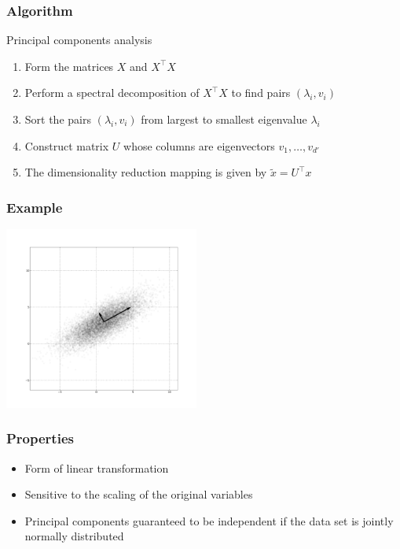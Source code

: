 \documentclass[10pt]{beamer}
\begin{document}
\begin{frame}
  \frametitle{Algorithm}
  \begin{block}{Principal components analysis}
  \begin{enumerate}
	\item Form the matrices $X$ and $X^\top X$
	\item Perform a spectral decomposition of $X^\top X$ to find pairs $(\lambda_i,v_i)$
	\item Sort the pairs $(\lambda_i,v_i)$ from largest to smallest eigenvalue $\lambda_i$
	\item Construct matrix $U$ whose columns are eigenvectors $v_1,\ldots,v_{d'}$
	\item The dimensionality reduction mapping is given by $\tilde{x} = U^\top x$
  \end{enumerate}
  \end{block}
\end{frame}

\begin{frame}
  \frametitle{Example}
  \centerline{\includegraphics[height=6cm]{images/pca.png}}
\end{frame}

\begin{frame}
  \frametitle{Properties}
  \begin{itemize}
	\item Form of linear transformation
	\item Sensitive to the {\color{red} scaling} of the original variables
	\item Principal components guaranteed to be independent if the data set is
		jointly normally distributed
  \end{itemize}
\end{frame}
\end{document}
